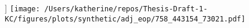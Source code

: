 \begin{figure}[h]]
\centering
\texttt{[image: /Users/katherine/repos/Thesis-Draft-1-KC/figures/plots/synthetic/adj\_eop/758\_443154\_73021.pdf]}
\caption{}
\label{fig:}
\end{figure}
